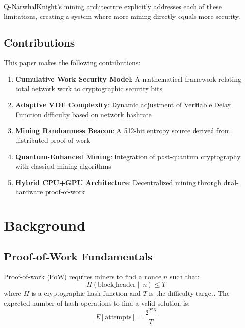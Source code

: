 \documentclass[11pt,a4paper]{article}
\begin{document}
Q-NarwhalKnight's mining architecture explicitly addresses each of these limitations, creating a system where more mining directly equals more security.

\subsection{Contributions}

This paper makes the following contributions:
\begin{enumerate}
    \item \textbf{Cumulative Work Security Model}: A mathematical framework relating total network work to cryptographic security bits
    \item \textbf{Adaptive VDF Complexity}: Dynamic adjustment of Verifiable Delay Function difficulty based on network hashrate
    \item \textbf{Mining Randomness Beacon}: A 512-bit entropy source derived from distributed proof-of-work
    \item \textbf{Quantum-Enhanced Mining}: Integration of post-quantum cryptography with classical mining algorithms
    \item \textbf{Hybrid CPU+GPU Architecture}: Decentralized mining through dual-hardware proof-of-work
\end{enumerate}

\section{Background}

\subsection{Proof-of-Work Fundamentals}

Proof-of-work (PoW) requires miners to find a nonce $n$ such that:
\begin{equation}
    H(\text{block\_header} \| n) \leq T
\end{equation}
where $H$ is a cryptographic hash function and $T$ is the difficulty target. The expected number of hash operations to find a valid solution is:
\begin{equation}
    E[\text{attempts}] = \frac{2^{256}}{T}
\end{equation}
\end{document}
